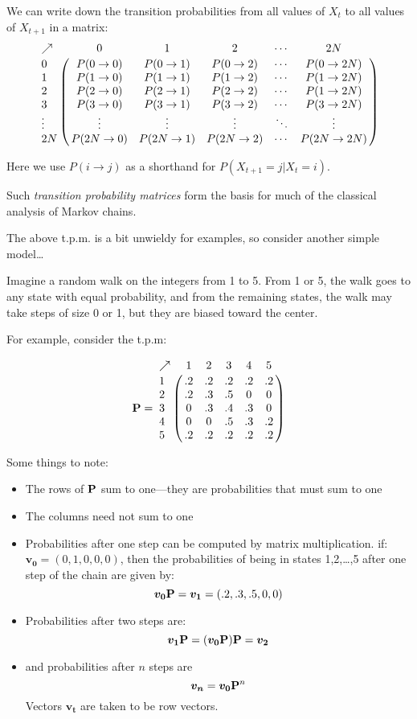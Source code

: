 We can write down the transition probabilities from all values of $X_t$ to all values of $X_{t+1}$ in a matrix:  {\small
\[
	\bordermatrix{
  \nearrow &0   &   1&   2  & \cdots & 2N \cr
 0 &
	P(0\rightarrow 0) &
	 P(0\rightarrow 1) &
	 	 P(0\rightarrow 2) &
		 	\cdots &
			 	  P(0\rightarrow 2N) \cr
 1 &
	P(1\rightarrow 0) &
	 P(1\rightarrow 1) &
	 	 P(1\rightarrow 2) &
		 	 \cdots &
			 	  P(1\rightarrow 2N) \cr
2 &
	P(2\rightarrow 0) &
	 P(2\rightarrow 1) &
	 	 P(2\rightarrow 2) &
		 	 \cdots &
			 	  P(1\rightarrow 2N) \cr
3 &
	P(3\rightarrow 0) &
	 P(3\rightarrow 1) &
	 	 P(3\rightarrow 2) &
		 	 \cdots &
			 	  P(3\rightarrow 2N) \cr
\vdots & \vdots & \vdots &\vdots &\ddots & \vdots \cr
2N &
	P(2N\rightarrow 0) &
	 P(2N\rightarrow 1) &
	 	 P(2N\rightarrow 2) &
		 	 \cdots &
			 	  P(2N\rightarrow 2N) \cr
}
\]
}

Here we use $P(i\rightarrow j)$ as a shorthand for $P(X_{t+1}=j|X_t=i)$.

Such {\sl transition probability matrices} form the basis for much of the classical analysis of Markov chains.

The above t.p.m. is a bit unwieldy for examples, so consider another simple model\ldots


Imagine a random walk on the integers from 1 to 5.  From 1 or 5, the walk goes to any state with equal probability, and from the remaining states, the walk may take steps of size 0 or 1, but they are biased toward the center.  

For example, consider the t.p.m:

\[
	\mP = \bordermatrix{
	\nearrow & 1 & 2 & 3 & 4 & 5 \cr
	1 & .2 & .2 & .2 & .2 & .2 \cr 
	2 & .2 & .3 & .5 & 0 & 0 \cr 
	3 & 0 & .3 & .4 & .3 & 0 \cr 
	4 & 0 & 0 & .5 & .3 & .2 \cr 
	5 & .2 & .2 & .2 & .2 & .2
	}
\] 

\newpage
Some things to note:
\begin{itemize}
\item The rows of $\mathbf{P}$ sum to one---they are probabilities that must sum to one
\item The columns need not sum to one
\item Probabilities after one step can be computed by matrix multiplication.  \ie{} if:
$\bm{v_0} = (0,1,0,0,0)$, then the probabilities of being in states 1,2,\ldots,5 after one step of the chain are given by:
\[
\bm{v_0}\mP = \bm{v_1} = (.2,.3,.5,0,0)
\] 
\item Probabilities after two steps are:
\[
	\bm{v_1}\mP = (\bm{v_0}\mP)\mP = \bm{v_2}
\]
\item and probabilities after $n$ steps are
\[
\bm{v_n} = \bm{v_0}\mP^n
\]
Vectors $\bm{v_t}$ are taken to be row vectors.
\end{itemize}


